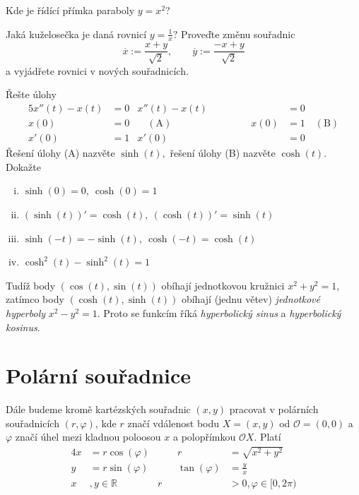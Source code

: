 \begin{úloha}
  Kde je řídící přímka paraboly $y=x^{2}$?
\end{úloha}

\begin{úloha}
  Jaká kuželosečka je daná rovnicí $y=\frac{1}{x}?$ Proveďte změnu souřadnic
  \begin{equation*}
	  \overline{x}:=\frac{x+y}{\sqrt{2}},\qquad \overline{y}:=\frac{-x+y}{\sqrt{2}}
  \end{equation*}
  a vyjádřete rovnici v nových souřadnicích.
\end{úloha}

\begin{úloha}
Řešte úlohy
  \begin{alignat*}{5}
	  x''(t)-x(t) &= 0 & x''(t)-x(t) &= 0 \\
	  x(0) &= 0 & \quad (\text{A}) \hspace{8em}       x(0) &= 1 \quad (\text{B}) \\
	  	x'(0) &= 1 & 		           x'(0) &= 0
  \end{alignat*}
Řešení úlohy (A) nazvěte $\sinh(t),$ řešení úlohy (B) nazvěte $\cosh(t).$ Dokažte 
\begin{enumerate}[(i)]
	\item $\sinh(0)=0,\ \cosh(0)=1$
	\item $(\sinh(t))'=\cosh(t),\ (\cosh(t))'=\sinh(t)$
	\item $\sinh(-t)=-\sinh(t),\ \cosh(-t)=\cosh(t)$
	\item $\cosh^{2}(t)-\sinh^{2}(t)=1$
\end{enumerate}
Tudíž body $(\cos(t),\sin(t))$ obíhají jednotkovou kružnici $x^{2}+y^{2}=1$, zatímco body $(\cosh(t),\sinh(t))$ obíhají (jednu větev) \emph{jednotkové hyperboly} $x^{2}-y^{2}=1.$ Proto se funkcím říká \emph{hyperbolický sinus} a \emph{hyperbolický kosinus}.
\end{úloha}

\section{Polární souřadnice}
Dále budeme kromě kartézských souřadnic $(x,y)$ pracovat v polárních souřadnicích $(r,\varphi)$, kde $r$ značí vdálenost bodu $X=(x,y)$ od $\mathcal{O}=(0,0)$ a $\varphi$ značí úhel mezi kladnou poloosou $x$ a polopřímkou $\mathcal{O}X.$ Platí
\begin{alignat*}{4}
	x &= r\cos(\varphi)& \qquad r&=\sqrt{x^{2}+y^{2}} \\
	y &= r\sin(\varphi)& \qquad \tan(\varphi) &= \frac{y}{x} \\
	x&,y\in \mathbb{R}& r&>0,\varphi\in[0,2\pi)
\end{alignat*}

